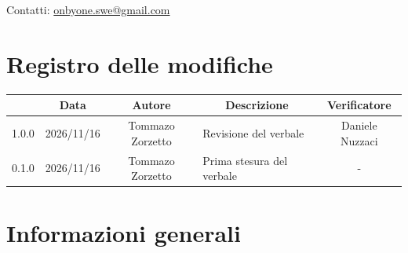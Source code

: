 \documentclass[11pt, a4paper]{article}
\begin{document}
\begin{titlepage}
    \vspace{0.5cm}

    {\large Contatti: \href{mailto:onbyone.swe@gmail.com}{onbyone.swe@gmail.com} }

\end{titlepage}

\section*{Registro delle modifiche}

\vspace{1cm}
\begin{center}
    \renewcommand{\arraystretch}{1.5}
    \begin{tabularx}{\textwidth}{|c|c|c|X|c|}
        \hline
        \rowcolor{gray!10}
        \multicolumn{1}{|c|}{\textbf{Versione}} &
        \multicolumn{1}{c|}{\textbf{Data}} &
        \multicolumn{1}{c|}{\textbf{Autore}} &
        \multicolumn{1}{c|}{\textbf{Descrizione}} &
        \multicolumn{1}{c|}{\textbf{Verificatore}} \\
        \hline
        1.0.0 & 2026/11/16 & Tommazo Zorzetto & Revisione del verbale & Daniele Nuzzaci \\
        \hline
        0.1.0 & 2026/11/16 & Tommazo Zorzetto & Prima stesura del verbale & - \\
        \hline
    \end{tabularx}
\end{center}
\vfill
\newpage

\tableofcontents
\newpage

\section{Informazioni generali}
\end{document}
